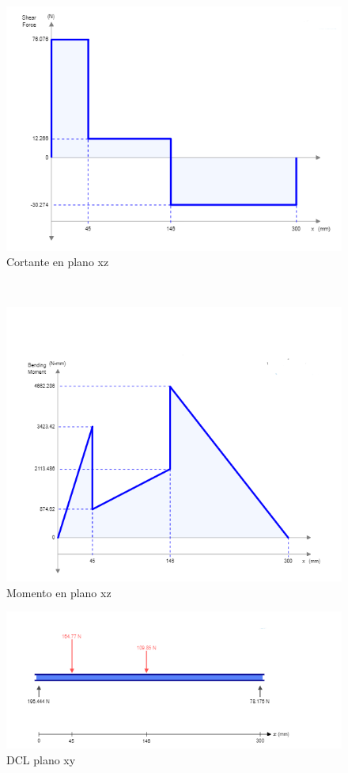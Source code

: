 \begin{figure}[ht!]
    \centering
    \includegraphics{Cap5_DisenoDetallado/Figuras/Eje/Vxz.PNG}
    \caption{Cortante en plano xz}
    \label{fig:Vxz}
\end{figure}
\newpage
~
\newpage
\begin{figure}[ht!]
    \centering
    \includegraphics{Cap5_DisenoDetallado/Figuras/Eje/Flectorxz.PNG}
    \caption{Momento en plano xz}
    \label{fig:Fxz}
\end{figure}


\begin{figure}[htb!]
    \centering
    \includegraphics{Cap5_DisenoDetallado/Figuras/Eje/ejexy.PNG}
    \caption{DCL plano xy}
    \label{fig:ejexy}
\end{figure}

